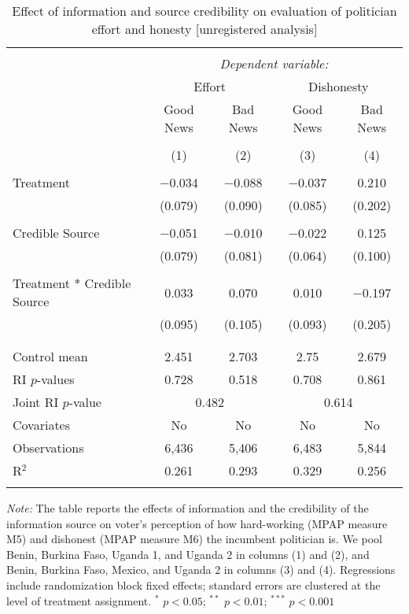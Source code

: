 \documentclass[]{article}
\begin{document}
\begin{table}[!htbp] \centering 
  \caption{Effect of information and source credibility on evaluation of politician effort and honesty [unregistered analysis]} 
  \label{effort_honesty_credibility} 
\begin{tabular}{@{\extracolsep{1pt}}lcccc} 
\\[-1.8ex]\hline 
\hline \\[-1.8ex] 
 & \multicolumn{4}{c}{\textit{Dependent variable:}} \\ 
\cline{2-5} 
& \multicolumn{2}{c}{Effort}&\multicolumn{2}{c}{Dishonesty}\\
\cline{2-5}
 & Good News & Bad News & Good News & Bad News \\ 
\\[-1.8ex] & (1) & (2) & (3) & (4)\\ 
\hline \\[-1.8ex] 
 Treatment & $-$0.034 & $-$0.088 & $-$0.037 & 0.210 \\ 
  & (0.079) & (0.090) & (0.085) & (0.202) \\ 
  & & & & \\ 
 Credible Source & $-$0.051 & $-$0.010 & $-$0.022 & 0.125 \\ 
  & (0.079) & (0.081) & (0.064) & (0.100) \\ 
  & & & & \\ 
 Treatment * Credible Source & 0.033 & 0.070 & 0.010 & $-$0.197 \\ 
  & (0.095) & (0.105) & (0.093) & (0.205) \\ 
  & & & & \\ 
\hline \\[-1.8ex] 
Control mean & 2.451 & 2.703 & 2.75 & 2.679 \\ 
RI $p$-values & 0.728 & 0.518 & 0.708 & 0.861 \\ 
Joint RI $p$-value & \multicolumn{2}{c}{0.482} & \multicolumn{2}{c}{0.614} \\
Covariates & No & No & No & No \\ 
Observations & 6,436 & 5,406 & 6,483 & 5,844 \\ 
R$^{2}$ & 0.261 & 0.293 & 0.329 & 0.256 \\ 
\hline 
\hline \\[-1.8ex] 
\end{tabular} 
\begin{flushleft}\textit{Note:} The table reports the effects of information and the credibility of the information source on voter's perception of how hard-working (MPAP measure M5) and dishonest (MPAP measure M6) the incumbent politician is. We pool Benin, Burkina Faso, Uganda 1, and Uganda 2 in columns (1) and (2), and Benin, Burkina Faso, Mexico, and Uganda 2 in columns (3) and (4). Regressions include randomization block fixed effects; standard errors are clustered at the level of treatment assignment. $^*$ $p<0.05$; $^{**}$ $p<0.01$; $^{***}$ $p<0.001$ \end{flushleft}
\end{table}
\end{document}
